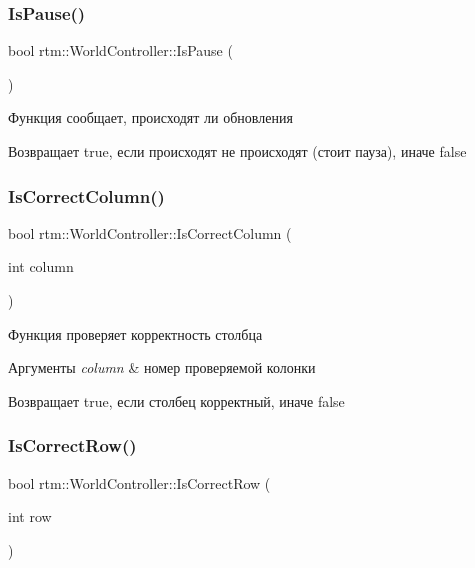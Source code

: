 \subsubsection{\texorpdfstring{Is\+Pause()}{IsPause()}}
{\footnotesize\ttfamily bool rtm\+::\+World\+Controller\+::\+Is\+Pause (\begin{DoxyParamCaption}{ }\end{DoxyParamCaption})}

Функция сообщает, происходят ли обновления \begin{DoxyReturn}{Возвращает}
true, если происходят не происходят (стоит пауза), иначе false 
\end{DoxyReturn}
\mbox{\label{classrtm_1_1_world_controller_ae560ff85d296effbe814dbadc2514ccf}} 
\subsubsection{\texorpdfstring{Is\+Correct\+Column()}{IsCorrectColumn()}}
{\footnotesize\ttfamily bool rtm\+::\+World\+Controller\+::\+Is\+Correct\+Column (\begin{DoxyParamCaption}\item[{int}]{column }\end{DoxyParamCaption})}

Функция проверяет корректность столбца 
\begin{DoxyParams}{Аргументы}
{\em column} & номер проверяемой колонки \\
\hline
\end{DoxyParams}
\begin{DoxyReturn}{Возвращает}
true, если столбец корректный, иначе false 
\end{DoxyReturn}
\mbox{\label{classrtm_1_1_world_controller_ae468c9d0d4de9c4250eea4c78dc9eb7a}} 
\subsubsection{\texorpdfstring{Is\+Correct\+Row()}{IsCorrectRow()}}
{\footnotesize\ttfamily bool rtm\+::\+World\+Controller\+::\+Is\+Correct\+Row (\begin{DoxyParamCaption}\item[{int}]{row }\end{DoxyParamCaption})}

